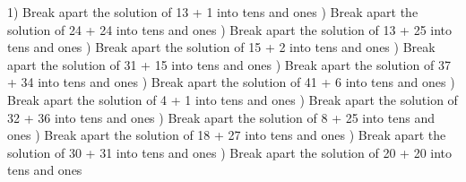 \documentclass{article}%
\begin{document}
1) Break apart the solution of 13 + 1 into tens and ones%
\newline%
\newline%
) Break apart the solution of 24 + 24 into tens and ones%
\newline%
\newline%
) Break apart the solution of 13 + 25 into tens and ones%
\newline%
\newline%
) Break apart the solution of 15 + 2 into tens and ones%
\newline%
\newline%
) Break apart the solution of 31 + 15 into tens and ones%
\newline%
\newline%
) Break apart the solution of 37 + 34 into tens and ones%
\newline%
\newline%
) Break apart the solution of 41 + 6 into tens and ones%
\newline%
\newline%
) Break apart the solution of 4 + 1 into tens and ones%
\newline%
\newline%
) Break apart the solution of 32 + 36 into tens and ones%
\newline%
\newline%
) Break apart the solution of 8 + 25 into tens and ones%
\newline%
\newline%
) Break apart the solution of 18 + 27 into tens and ones%
\newline%
\newline%
) Break apart the solution of 30 + 31 into tens and ones%
\newline%
\newline%
) Break apart the solution of 20 + 20 into tens and ones%
\newline%
\end{document}
